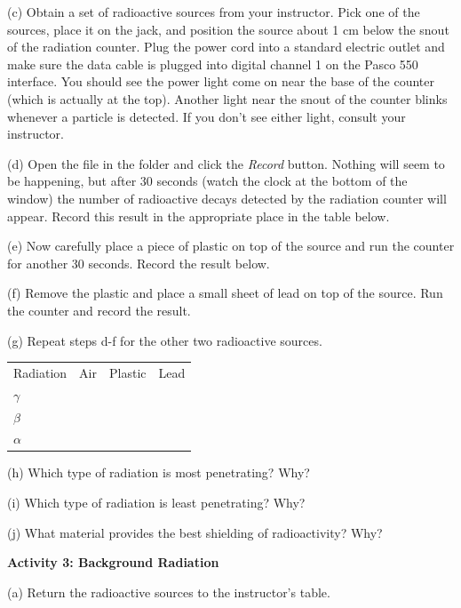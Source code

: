 (c) Obtain a set of radioactive sources from your instructor.
Pick one of the sources, place it on the jack, and position the source about 1 cm below
the snout of the radiation counter.
Plug the power cord into a standard electric outlet and make sure the data cable is plugged
into digital channel 1 on the Pasco 550 interface.
You should see the power light come on near the base of the counter (which is actually at the
top).
Another light near the snout of the counter blinks whenever a particle
is detected.
If you don't see either light, consult your instructor.

(d) Open the  file in the \filename{\coursefolder} folder and click
the \textit{Record} button.
Nothing will seem to be happening, but after 30 seconds (watch the clock at the bottom
of the window) the number of radioactive decays detected by the 
radiation counter will appear.
Record this result in the appropriate place in the table below.

(e) Now carefully place a piece of plastic on top of the source and run the
counter for another 30 seconds. Record the result below.

(f) Remove the plastic and place a small sheet of lead on top of the source.
Run the counter and record the result.

(g) Repeat steps d-f for the other two radioactive sources.


\vspace{0.3cm}
{\renewcommand{\arraystretch}{1.1}
{\centering \begin{tabular}{*{4}{|C{0.7in}}|}%
\hline 
Radiation & Air & Plastic & Lead \\
\hhline{|=|=|=|=|}
\( \gamma \)&
&
&
\\
\hline 
\( \beta \)&
&
&
\\
\hline 
\( \alpha \)&
&
&
\\
\hline
\end{tabular}\par}}
\answerspace{0.3cm}

(h) Which type of radiation is most penetrating? Why?
\answerspace{15mm}

(i) Which type of radiation is least penetrating? Why?
\answerspace{15mm}

(j) What material provides the best shielding of radioactivity? Why?
\answerspace{15mm}

\textbf{Activity 3: Background Radiation}

(a) Return the radioactive sources to the instructor's table.

